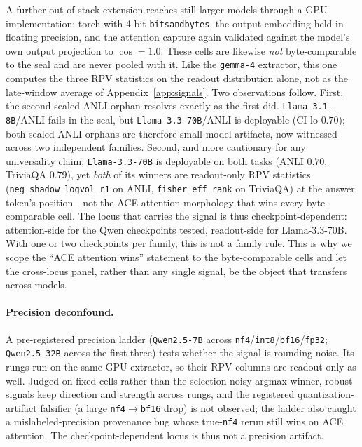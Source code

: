 \documentclass[11pt]{article}
\begin{document}
A further out-of-stack extension reaches still larger models through a GPU implementation: torch with
4-bit \texttt{bitsandbytes}, the output embedding held in floating precision, and the attention capture
again validated against the model's own output projection to $\cos{=}1.0$. These cells are likewise
\emph{not} byte-comparable to the seal and are never pooled with it. Like the \texttt{gemma-4}
extractor, this one computes the three RPV statistics on the readout distribution alone, not as the
late-window average of Appendix~\ref{app:signals}. Two observations follow. First,
the second sealed ANLI orphan resolves exactly as the first did. \texttt{Llama-3.1-8B}/ANLI fails in
the seal, but \texttt{Llama-3.3-70B}/ANLI is deployable (CI-lo $0.70$); both sealed ANLI orphans are
therefore small-model artifacts, now witnessed across two independent families. Second, and more
cautionary for any universality claim, \texttt{Llama-3.3-70B} is deployable on both tasks (ANLI
$0.70$, TriviaQA $0.79$), yet \emph{both} of its winners are readout-only RPV statistics
(\texttt{neg\_shadow\_logvol\_r1} on ANLI, \texttt{fisher\_eff\_rank} on TriviaQA) at the answer
token's position---not the ACE attention morphology that wins every byte-comparable cell. The locus
that carries the signal is thus checkpoint-dependent: attention-side for the Qwen checkpoints tested,
readout-side for Llama-3.3-70B. With one or two checkpoints per family, this is not a family rule.
This is why we scope the ``ACE attention wins'' statement to the byte-comparable cells and let the
cross-locus panel, rather than any single signal, be the object that transfers across models.

\paragraph{Precision deconfound.} A pre-registered precision ladder (\texttt{Qwen2.5-7B} across
\texttt{nf4}/\texttt{int8}/\texttt{bf16}/\texttt{fp32}; \texttt{Qwen2.5-32B} across the first three)
tests whether the signal is rounding noise. Its rungs run on the same GPU extractor, so their RPV
columns are readout-only as well. Judged on fixed cells rather than the selection-noisy
argmax winner, robust signals keep direction and strength across rungs, and the registered
quantization-artifact falsifier (a large \texttt{nf4}$\to$\texttt{bf16} drop) is not observed; the
ladder also caught a mislabeled-precision provenance bug whose true-\texttt{nf4} rerun still wins on
ACE attention. The checkpoint-dependent locus is thus not a precision artifact.
\end{document}
